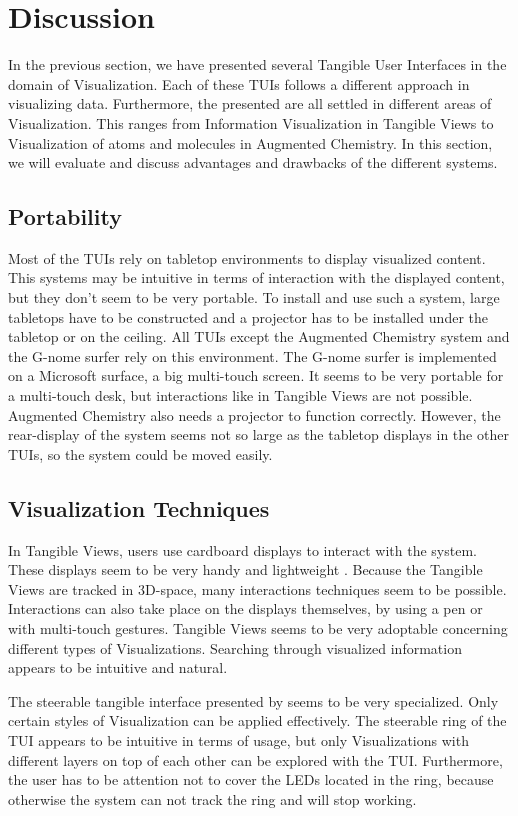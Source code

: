 \section{Discussion}
In the previous section, we have presented several Tangible User Interfaces in the domain of Visualization. Each of these TUIs follows a different approach in visualizing data. Furthermore, the presented are all settled in different areas of Visualization. This ranges from Information Visualization in Tangible Views to Visualization of atoms and molecules in Augmented Chemistry. In this section, we will evaluate and discuss advantages and drawbacks of the different systems. 

\subsection{Portability}
Most of the TUIs rely on tabletop environments to display visualized content. This systems may be intuitive in terms of interaction with the displayed content, but they don't seem to be very portable. To install and use such a system, large tabletops have to be constructed and a projector has to be installed under the tabletop or on the ceiling. All TUIs except the Augmented Chemistry system and the G-nome surfer rely on this environment. The G-nome surfer is implemented on a Microsoft surface, a big multi-touch screen. It seems to be very portable for a multi-touch desk, but interactions like in Tangible Views are not possible. Augmented Chemistry also needs a projector to function correctly. However, the rear-display of the system seems not so large as the tabletop displays in the other TUIs, so the system could be moved easily. 

\subsection{Visualization Techniques}
In Tangible Views, users use cardboard displays to interact with the system. These displays seem to be very handy and lightweight . Because the Tangible Views are tracked in 3D-space, many interactions techniques seem to be possible. Interactions can also take place on the displays themselves, by using a pen or with multi-touch gestures. Tangible Views seems to be very adoptable concerning different types of Visualizations. Searching through visualized information appears to be intuitive and natural. 

The steerable tangible interface presented by \cite{lee09} seems to be very specialized. Only certain styles of Visualization can be applied effectively. The steerable ring of the TUI appears to be intuitive in terms of usage, but only Visualizations with different layers on top of each other can be explored with the TUI. Furthermore, the user has to be attention not to cover the LEDs located in the ring, because otherwise the system can not track the ring and will stop working. 

